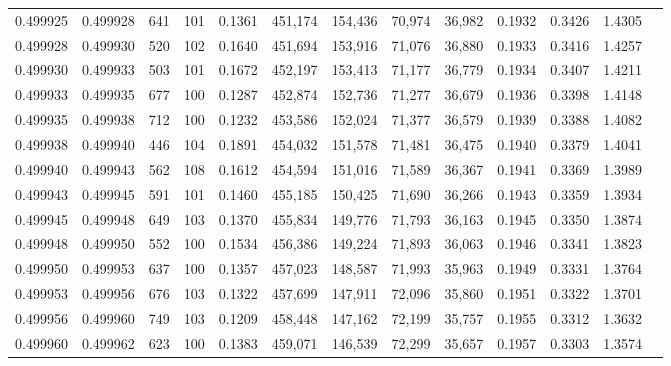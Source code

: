 \begin{tabular}{rrrrrrrrrrrrr}
0.499925 & 0.499928 &   641 & 101 &                                     0.1361 & 451,174 & 154,436 &  70,974 &  36,982 & 0.1932 & 0.3426 & 1.4305 \\
0.499928 & 0.499930 &   520 & 102 &                                     0.1640 & 451,694 & 153,916 &  71,076 &  36,880 & 0.1933 & 0.3416 & 1.4257 \\
0.499930 & 0.499933 &   503 & 101 &                                     0.1672 & 452,197 & 153,413 &  71,177 &  36,779 & 0.1934 & 0.3407 & 1.4211 \\
0.499933 & 0.499935 &   677 & 100 &                                     0.1287 & 452,874 & 152,736 &  71,277 &  36,679 & 0.1936 & 0.3398 & 1.4148 \\
0.499935 & 0.499938 &   712 & 100 &                                     0.1232 & 453,586 & 152,024 &  71,377 &  36,579 & 0.1939 & 0.3388 & 1.4082 \\
0.499938 & 0.499940 &   446 & 104 &                                     0.1891 & 454,032 & 151,578 &  71,481 &  36,475 & 0.1940 & 0.3379 & 1.4041 \\
0.499940 & 0.499943 &   562 & 108 &                                     0.1612 & 454,594 & 151,016 &  71,589 &  36,367 & 0.1941 & 0.3369 & 1.3989 \\
0.499943 & 0.499945 &   591 & 101 &                                     0.1460 & 455,185 & 150,425 &  71,690 &  36,266 & 0.1943 & 0.3359 & 1.3934 \\
0.499945 & 0.499948 &   649 & 103 &                                     0.1370 & 455,834 & 149,776 &  71,793 &  36,163 & 0.1945 & 0.3350 & 1.3874 \\
0.499948 & 0.499950 &   552 & 100 &                                     0.1534 & 456,386 & 149,224 &  71,893 &  36,063 & 0.1946 & 0.3341 & 1.3823 \\
0.499950 & 0.499953 &   637 & 100 &                                     0.1357 & 457,023 & 148,587 &  71,993 &  35,963 & 0.1949 & 0.3331 & 1.3764 \\
0.499953 & 0.499956 &   676 & 103 &                                     0.1322 & 457,699 & 147,911 &  72,096 &  35,860 & 0.1951 & 0.3322 & 1.3701 \\
0.499956 & 0.499960 &   749 & 103 &                                     0.1209 & 458,448 & 147,162 &  72,199 &  35,757 & 0.1955 & 0.3312 & 1.3632 \\
0.499960 & 0.499962 &   623 & 100 &                                     0.1383 & 459,071 & 146,539 &  72,299 &  35,657 & 0.1957 & 0.3303 & 1.3574 \\

\end{tabular}
